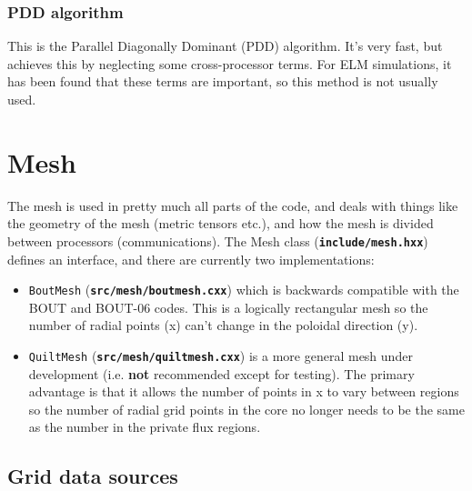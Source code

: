 \documentclass[12pt]{article}
\newcommand{\file}[1]{\texttt{\bf #1}}
\begin{document}
\subsubsection{PDD algorithm}

This is the Parallel Diagonally Dominant (PDD) algorithm. It's very fast, but
achieves this by neglecting some cross-processor terms. For ELM simulations, 
it has been found that these terms are important, so this method is not
usually used. 

\section{Mesh}
The mesh is used in pretty much all parts of the code, and deals with 
things like the geometry of the mesh (metric tensors etc.), and how the
mesh is divided between processors (communications). The Mesh class
(\file{include/mesh.hxx}) defines an interface, and there are currently
two implementations:
\begin{itemize}
\item \lstinline!BoutMesh! (\file{src/mesh/boutmesh.cxx})  which is backwards compatible
  with the BOUT and BOUT-06 codes. This is a logically rectangular mesh so
  the number of radial points (x) can't change in the poloidal direction (y). 
  
\item \lstinline!QuiltMesh! (\file{src/mesh/quiltmesh.cxx})  is a more general mesh under development
  (i.e. {\bf not} recommended except for testing). The primary advantage is that
  it allows the number of points in x to vary between regions so the number of radial
  grid points in the core no longer needs to be the same as the number in the private
  flux regions.
\end{itemize}

\subsection{Grid data sources}
\end{document}
